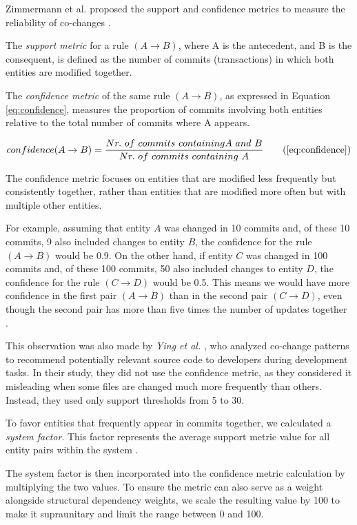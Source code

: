 Zimmermann et al. proposed the support and confidence metrics to measure the reliability of co-changes \cite{Zimmermann:2004:MVH:998675.999460}.

The \textit{support metric} for a rule $(A \rightarrow B)$, where A is the antecedent, and B is the consequent, is defined as the number of commits (transactions) in which both entities are modified together.

The \textit{confidence metric} of the same rule $(A \rightarrow B)$, as expressed in Equation \eqref{eq:confidence}, measures the proportion of commits involving both entities relative to the total number of commits where A appears.

\[
\text{$confidence$}(A \rightarrow B) = \frac{\text{$Nr.\ of\ commits\ containing$} A \text{ $and$ } B}{\text{$Nr.\ of\ commits\ containing$ } A}
\tag{\ref{eq:confidence}}
\]



The confidence metric focuses on entities that are modified less frequently but consistently together, rather than entities that are modified more often but with multiple other entities.

For example, assuming that entity \( A \) was changed in 10 commits and, of these 10 commits, 9 also included changes to entity \( B \), the confidence for the rule \( (A \rightarrow B) \) would be 0.9. On the other hand, if entity \( C \) was changed in 100 commits and, of these 100 commits, 50 also included changes to entity \( D \), the confidence for the rule \( (C \rightarrow D) \) would be 0.5. This means we would have more confidence in the first pair \( (A \rightarrow B) \) than in the second pair \( (C \rightarrow D) \), even though the second pair has more than five times the number of updates together \cite{cluster-access}.


This observation was also made by \textit{Ying et al.} \cite{Ying-co-change}, who analyzed co-change patterns to recommend potentially relevant source code to developers during development tasks. In their study, they did not use the confidence metric, as they considered it misleading when some files are changed much more frequently than others. Instead, they used only support thresholds from 5 to 30.
 

To favor entities that frequently appear in commits together, we calculated a \textit{system factor}. This factor represents the average support metric value for all entity pairs within the system \cite{cluster-access}.

The system factor is then incorporated into the confidence metric calculation by multiplying the two values. To ensure the metric can also serve as a weight alongside structural dependency weights, we scale the resulting value by 100 to make it supraunitary and limit the range between 0 and 100.

